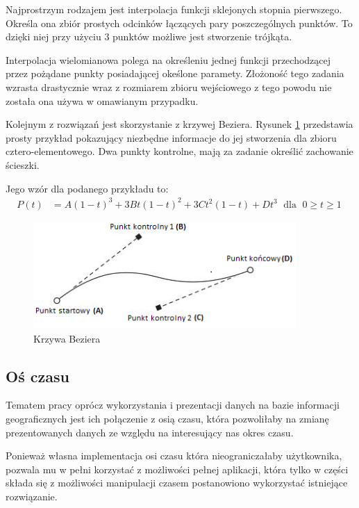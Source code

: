 Najprostrzym rodzajem jest interpolacja funkcji sklejonych stopnia pierwszego. Określa ona zbiór prostych odcinków łączących pary poszczególnych punktów. To dzięki niej przy użyciu 3 punktów możliwe jest stworzenie trójkąta.

Interpolacja wielomianowa  polega na  określeniu jednej funkcji przechodzącej przez pożądane punkty posiadającej okeślone paramety. Złożoność tego zadania wzrasta drastycznie wraz z rozmiarem zbioru wejściowego z tego powodu nie została ona używa w omawianym przypadku.

Kolejnym z rozwiązań jest skorzystanie z krzywej Beziera. Rysunek \ref{fig:bezier} przedstawia prosty przykład pokazujący niezbędne informacje do jej stworzenia dla zbioru cztero-elementowego. Dwa punkty kontrolne, mają  za zadanie określić zachowanie ścieszki.

Jego wzór dla podanego przykładu to:
\begin{eqnarray}
P(t) &= A (1-t)^{3} + 3 B t(1-t)^{2} + 3 C t^{2} (1-t) + D t^{3} \; \textrm{ dla } \; 0 \geq t \geq 1\;
\end{eqnarray}

\begin{figure}[H]
  \centering
    \includegraphics[width=100mm]{ge/bezier.png}
  \caption{Krzywa Beziera}
  \label{fig:bezier}
\end{figure}

\subsection{Oś czasu}
\label{subsec:os}

Tematem pracy oprócz wykorzystania i prezentacji danych na bazie informacji geograficznych jest ich połączenie z osią czasu, która pozwoliłaby na zmianę prezentowanych danych ze względu na interesujący nas okres czasu.

Ponieważ własna implementacja osi czasu która nieograniczałaby użytkownika, pozwala mu w pełni korzystać z możliwości pełnej aplikacji, która tylko w części składa się z możliwości manipulacji czasem postanowiono wykorzystać istniejące rozwiązanie.

